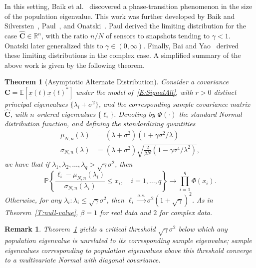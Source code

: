 \documentclass[final]{IEEEtran} %
\newtheorem{theorem}{Theorem}
\newtheorem{rem}{Remark}
\newcommand{\vectorsymbol}{\underline}
\newcommand{\matrixsymbol}{\boldsymbol}
\newcommand{\mC}{\matrixsymbol{C}}
\newcommand{\mhC}{\widehat{\matrixsymbol{C}}}
\newcommand{\vx}{\vectorsymbol{x}}
\newcommand{\E}{\mathbb{E}}
\newcommand{\Prob}{\mathbb{P}}
\begin{document}
In this setting, Baik et al.~\cite{baik2005pto} discovered a phase-transition phenomenon in the size of the population eigenvalue.  This work was further developed by Baik and Silversten~\cite{baik2006els}, Paul~\cite{paul2007ase}, and Onatski~\cite{onatski2007adp}.  Paul derived the limiting distribution for the case $\mhC \in \mathbb{R}^n$, with the ratio $n/N$ of sensors to snapshots tending to $\gamma < 1$.  Onatski later generalized this to $\gamma \in (0,\infty)$.  Finally, Bai and Yao~\cite{bai2008clt} derived these limiting distributions in the complex case.  A simplified summary of the above work is given by the following theorem.
\begin{theorem}[Asymptotic Alternate Distribution]\label{T:spiked-value}
    Consider a covariance $\mC = \E\left[ \vx(t) \vx(t)^* \right]$ under the model of~\eqref{E:SignalAlt}, with $r>0$ distinct principal eigenvalues $\{\lambda_i + \sigma^2\}$, and the corresponding
    sample covariance matrix $\mhC$, with $n$ ordered eigenvalues $\{\ell_i\}$.
    Denoting by $\Phi( \cdot )$ the standard Normal distribution function, and defining the standardizing quantities
    \begin{align*}
        \mu_{N,n}(\lambda)
            &= \left( \lambda + \sigma^2 \right)
                \left(1 + \gamma \sigma^2/\lambda \right) \\
        \sigma_{N,n}(\lambda)
            &= \left( \lambda + \sigma^2 \right) \textstyle
               \sqrt{
                   \frac{2}{\beta N}
                   \left( 1 - \gamma \sigma^4/\lambda^2 \right)
               },
    \end{align*}
    we have that if $\lambda_{1}, \lambda_{2}, \ldots, \lambda_{q} > \sqrt{\gamma} \sigma^2$, then
    \begin{equation*}
        \Prob \left\{ \frac{\ell_i - \mu_{N,n}(\lambda_i)}
                           {\sigma_{N,n}(\lambda_i)}       \leq x_i,
                            \quad
                            i = 1, \ldots, q \right\}
        \to
        \prod_{i=1}^q \Phi ( x_i ).
    \end{equation*}
    Otherwise, for any $\lambda_i\!:\! \lambda_i \leq \sqrt{\gamma} \sigma^2$, then $\ell_i \overset{a.s.}{\longrightarrow} \sigma^2 \left( 1 + \sqrt{\gamma} \right)^2$.
    As in Theorem~\ref{T:null-value}, $\beta = 1$ for real data and
    $2$ for complex data.
\end{theorem}
\begin{rem}
Theorem~\ref{T:spiked-value} yields a critical threshold $\sqrt{\gamma} \sigma^2$
below which any population eigenvalue is unrelated to its corresponding sample eigenvalue; sample eigenvalues corresponding to population eigenvalues above this threshold converge to a multivariate Normal with diagonal covariance.
\end{rem}
\end{document}
